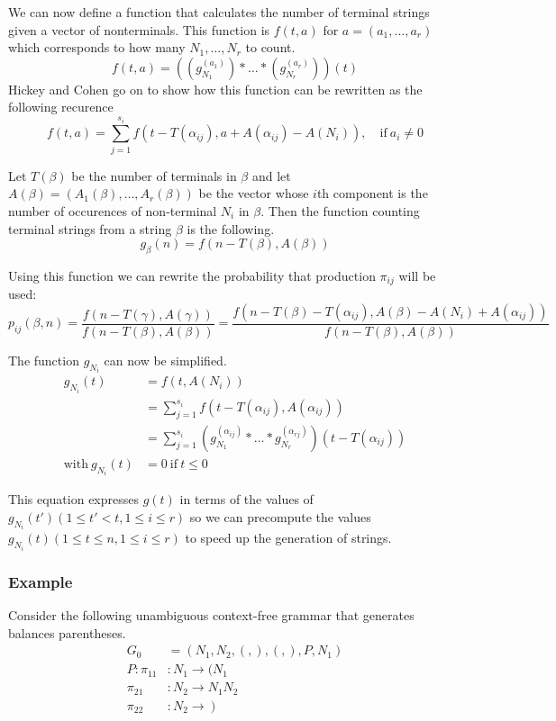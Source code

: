   We can now define a function that calculates the number of terminal strings given a vector of nonterminals. This function is $f(t, a)$ for $a = (a_1,\dots,a_r)$ which corresponds to how many $N_1,\dots,N_r$ to count.
  \[
  f(t, a) = \left((g_{N_1}^{(a_1)}) * \hdots * (g_{N_r}^{(a_r)})\right)(t)
  \]
  Hickey and Cohen go on to show how this function can be rewritten as the following recurence
  \[
  f(t,a) = \sum_{j=1}^{s_i}f(t-T(\alpha_{ij}), a+A(\alpha_{ij})-A(N_i)), \quad\mathrm{if}\ a_i \neq 0
  \]

  Let $T(\beta)$ be the number of terminals in $\beta$ and let $A(\beta) = (A_1(\beta),\dots,A_r(\beta))$ be the vector whose $i$th component is the number of occurences of non-terminal $N_i$ in $\beta$. Then the function counting terminal strings from a string $\beta$ is the following.
  \[
  g_\beta(n) = f(n-T(\beta), A(\beta))
  \]

  Using this function we can rewrite the probability that production $\pi_{ij}$ will be used:
  \[
  p_{ij}(\beta, n) = \frac{f(n - T(\gamma), A(\gamma))}{f(n-T(\beta), A(\beta))} = \frac{f(n-T(\beta)-T(\alpha_{ij}),A(\beta)-A(N_i)+A(\alpha_{ij}))}{f(n-T(\beta),A(\beta))}
  \]

  The function $g_{N_i}$ can now be simplified.
  \begin{align*}
  g_{N_i}(t) &= f(t, A(N_i)) \\
  &= \sum_{j=1}^{s_i} f(t-T(\alpha_{ij}), A(\alpha_{ij})) \\
  &= \sum_{j=1}^{s_i} \left(g_{N_1}^{(\alpha_{ij})} * \hdots * g_{N_r}^{(\alpha_{rj})}\right)(t - T(\alpha_{ij})) \\
  \mathrm{with}\ g_{N_i}(t) &= 0\ \mathrm{if}\ t \leq 0
  \end{align*}

  This equation expresses $g(t)$ in terms of the values of $g_{N_i}(t')(1 \leq t' < t, 1 \leq i \leq r)$ so we can precompute the values $g_{N_i}(t)(1 \leq t \leq n, 1 \leq i \leq r)$ to speed up the generation of strings.

  \subsubsection{Example}

    Consider the following unambiguous context-free grammar that generates balances parentheses.
    \begin{align*}
    G_0 &= ({N_1, N_2, (, )}, {(, )}, P, N_1) \\
    P : \pi_{11} &: N_1 \to (N_1 \\
        \pi_{21} &: N_2 \to N_1 N_2 \\
        \pi_{22} &: N_2 \to\ )
    \end{align*}

